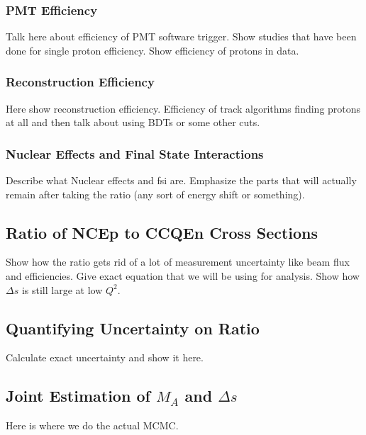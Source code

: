   \subsubsection{PMT Efficiency}
    Talk here about efficiency of PMT software trigger. Show studies that have
    been done for single proton efficiency. Show efficiency of protons in data.
  \subsubsection{Reconstruction Efficiency}
    Here show reconstruction efficiency.  Efficiency of track algorithms
    finding protons at all and then talk about using BDTs or some other cuts.
  \subsubsection{Nuclear Effects and Final State Interactions}
    Describe what Nuclear effects and fsi are. Emphasize the parts that will
    actually remain after taking the ratio (any sort of energy shift or
        something).

\subsection{Ratio of NCEp to CCQEn Cross Sections}\label{ratios}
  Show how the ratio gets rid of a lot of measurement uncertainty like beam
  flux and efficiencies. Give exact equation that we will be using for
  analysis. Show how $\Delta s$ is still large at low $Q^2$.

\subsection{Quantifying Uncertainty on Ratio}\label{errorcalc}
  Calculate exact uncertainty and show it here.

\subsection{Joint Estimation of $M_A$ and $\Delta s$}\label{deltas}
  Here is where we do the actual MCMC.
